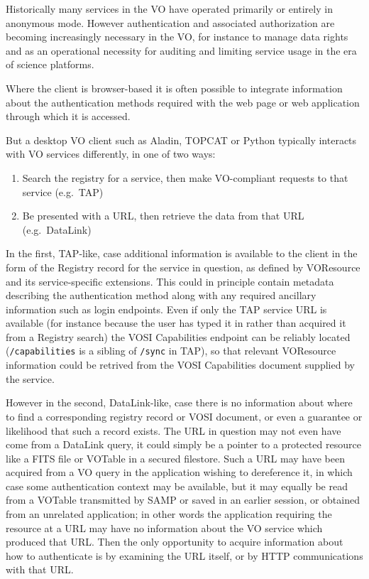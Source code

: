 \documentclass[11pt,a4paper]{ivoa}
\begin{document}
Historically many services in the VO have operated primarily or
entirely in anonymous mode.
However authentication and associated authorization
are becoming increasingly necessary in the VO,
for instance to manage data rights and as an operational necessity for
auditing and limiting service usage in the era of science platforms.

Where the client is browser-based
it is often possible to integrate information about the authentication
methods required with the web page or web application through which
it is accessed.

But a desktop VO client such as Aladin, TOPCAT or Python
typically interacts with VO services differently, in one of two
ways:
\begin{enumerate}
\item Search the registry for a service, then make VO-compliant
      requests to that service (e.g.\ TAP)
\item Be presented with a URL, then retrieve the data from that URL
      (e.g.\ DataLink)
\end{enumerate}
In the first, TAP-like, case additional information is available to the
client in the form of the Registry record for the service in question,
as defined by VOResource and its service-specific extensions.
This could in principle contain metadata describing the authentication
method along with any required ancillary information such as
login endpoints.
Even if only the TAP service URL is available
(for instance because the user has typed it in rather than acquired it
from a Registry search) the VOSI Capabilities endpoint can be reliably
located ({\tt /capabilities} is a sibling of {\tt /sync} in TAP),
so that relevant VOResource information could be retrived from the VOSI
Capabilities document supplied by the service.

However in the second, DataLink-like, case
there is no information about where to find a corresponding
registry record or VOSI document,
or even a guarantee or likelihood that such a record exists.
The URL in question may not even have come from a DataLink query,
it could simply be a pointer to a protected resource like a
FITS file or VOTable in a secured filestore.
Such a URL may have been acquired from a VO query in the application
wishing to dereference it, in which case some authentication context
may be available,
but it may equally be read from a VOTable transmitted by SAMP
or saved in an earlier session, or obtained from an unrelated application;
in other words the application requiring the resource at a URL may
have no information about the VO service which produced that URL.
Then the only opportunity to acquire information about how to authenticate
is by examining the URL itself, or by HTTP communications with that URL.
\end{document}
